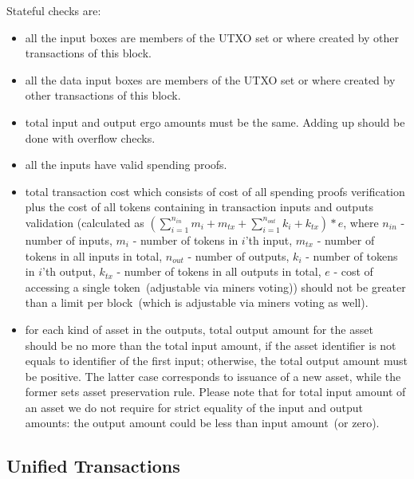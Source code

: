 \documentclass[]{article}   %
\newcommand{\authnote}[2]{\marginpar{\parbox{\marginparwidth}{\tiny %
  \textsf{#1 {\textcolor{blue}{notes: #2}}}}}%
  \textcolor{blue}{\textbf{\dag}}}
\newcommand{\authnote}[2]{
  \textsf{#1 \textcolor{blue}{: #2}}}
\newcommand{\authnote}[2]{}
\newcommand{\knote}[1]{{\authnote{\textcolor{green}{Alex notes}}{#1}}}
\newcommand{\dnote}[1]{{\authnote{\textcolor{red}{Dima notes}}{#1}}}
\begin{document}
\dnote{describe precisely during https://github.com/ergoplatform/ergo/issues/581}

Stateful checks are:

\begin{itemize}
    \item{} all the input boxes are members of the UTXO set or where created by other transactions of this block.
    \item{} all the data input boxes are members of the UTXO set or where created by other transactions of this block.
    \item{} total input and output ergo amounts must be the same. Adding up should be done with overflow checks.
    \item{} all the inputs have valid spending proofs.
    \item{} total transaction cost which consists of cost of all spending proofs verification
            plus the cost of all tokens containing in transaction inputs and outputs
            validation (calculated as $(\sum_{i=1}^{n_{in}} m_{i} + m_{tx} + \sum_{i=1}^{n_{out}} k_{i} + k_{tx}) * e$,
            where $n_{in}$ - number of inputs, $m_{i}$ - number of tokens in $i$'th input, $m_{tx}$ - number of tokens
            in all inputs in total, $n_{out}$ - number of outputs, $k_{i}$ - number of tokens in $i$'th output, $k_{tx}$
            - number of tokens in all outputs in total, $e$ - cost of accessing a single token~(adjustable via miners voting))
            should not be greater than a limit per block~(which is adjustable via miners voting as well).
    \item{} for each kind of asset in the outputs, total output amount for the asset should be no more than the total
            input amount, if the asset identifier is not equals to identifier of the first input; otherwise, the total
            output amount must be positive. The latter case corresponds to issuance of a new asset, while the former
            sets asset preservation rule. Please note that for total input amount of an asset we do not require for
            strict equality of the input and output amounts: the output amount could be less than input amount~(or zero).
\end{itemize}

\subsection{Unified Transactions}

\knote{Write about fee as boxes and absence of out-of-thin-air emission in the "coinbase" transaction.}
\end{document}
